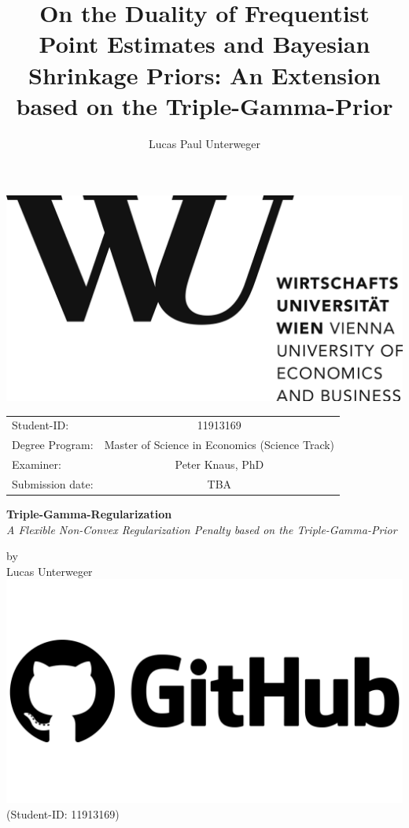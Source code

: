 \documentclass[12pt,a4paper]{article}
\author{Lucas Paul Unterweger}
\title{On the Duality of Frequentist Point Estimates and Bayesian Shrinkage Priors: An Extension based on the Triple-Gamma-Prior}
\begin{document}
\begin{titlepage}
\center
\vfill
\includegraphics[scale=0.1]{WU.png}
\vfill
\begin{tabular}[t]{lc}
Student-ID:  & 11913169 \\
Degree Program: & 
Master of Science in Economics (Science Track) \\
Examiner: & Peter Knaus, PhD \\
Submission date: & TBA \\
\end{tabular}
\vfill
{\large \textbf{Triple-Gamma-Regularization} \\
\normalsize \textit{A Flexible Non-Convex Regularization Penalty based on the Triple-Gamma-Prior}}


\vfill
by\\ \vspace{3mm}
{\Large Lucas Unterweger \href{https://github.com/therealLucasPaul}{\includegraphics[scale=0.01]{GitHub.png}}}\\
(Student-ID: 11913169)\\
\vfill

\thispagestyle{empty}
\pagebreak
\end{titlepage}
\thispagestyle{empty}
\end{document}
